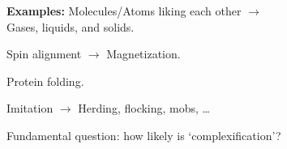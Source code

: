 
   \textbf{Examples:}
       Molecules/Atoms liking each other $\rightarrow$ \\
       \mbox{} \hfill Gases, liquids, and solids.
     
       Spin alignment $\rightarrow$ Magnetization.
      
       Protein folding.
      
       Imitation $\rightarrow$ Herding, flocking, mobs, \ldots
     \medskip

     {
       Fundamental question: how likely is `complexification'?
     }
 



